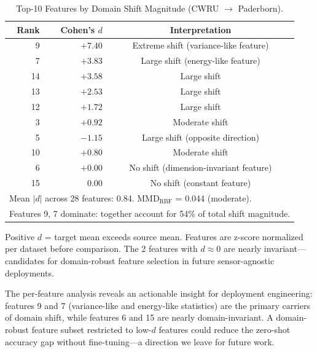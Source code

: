 \documentclass[journal,onecolumn]{IEEEtran}
\begin{document}
\begin{table}[t]
\centering
\caption{Top-10 Features by Domain Shift Magnitude (CWRU $\to$ Paderborn).}
\label{tab:paderborn_cohens_d}
\footnotesize
\begin{tabular}{@{}rrc@{}}
\toprule
\textbf{Rank} & \textbf{Cohen's $d$} & \textbf{Interpretation} \\
\midrule
 9 & $+7.40$ & Extreme shift (variance-like feature) \\
 7 & $+3.83$ & Large shift (energy-like feature) \\
14 & $+3.58$ & Large shift \\
13 & $+2.53$ & Large shift \\
12 & $+1.72$ & Large shift \\
 3 & $+0.92$ & Moderate shift \\
 5 & $-1.15$ & Large shift (opposite direction) \\
10 & $+0.80$ & Moderate shift \\
 6 & $+0.00$ & No shift (dimension-invariant feature) \\
15 & $ 0.00$ & No shift (constant feature) \\
\midrule
\multicolumn{3}{l}{Mean $|d|$ across 28 features: 0.84. MMD$_{\text{RBF}}$ = 0.044 (moderate).} \\
\multicolumn{3}{l}{Features 9, 7 dominate: together account for 54\% of total shift magnitude.} \\
\bottomrule
\end{tabular}
\vspace{2pt}
{\scriptsize Positive $d$ = target mean exceeds source mean. Features are
z-score normalized per dataset before comparison. The 2 features with
$d \approx 0$ are nearly invariant---candidates for domain-robust feature
selection in future sensor-agnostic deployments.}
\end{table}

The per-feature analysis reveals an actionable insight for deployment
engineering: features 9 and 7 (variance-like and energy-like statistics)
are the primary carriers of domain shift, while features 6 and 15 are
nearly domain-invariant. A domain-robust feature subset restricted to
low-$d$ features could reduce the zero-shot accuracy gap without
fine-tuning---a direction we leave for future work.
\end{document}

